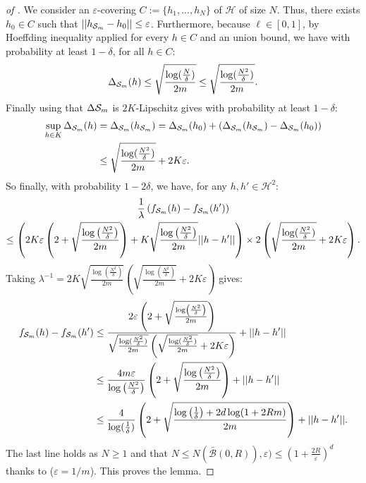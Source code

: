 \begin{noaddcontents}
\begin{proof}[of ]
We consider an $\varepsilon$-covering $C:=\{h_1,...,h_N\}$ of $\mathcal{H}$ of size $N$.
Thus, there exists $h_0\in C$ such that $||h_{\mathcal{S}_m}- h_0||\leq \varepsilon$.
Furthermore, because $\ell \in [0,1]$, by Hoeffding inequality applied for every $h\in C$ and an union bound, we have with probability at least $1-\delta$, for all $h\in C$:
\[ \Delta_{\mathcal{S}_m}(h) \leq  \sqrt{\frac{\log(\frac{N}{\delta})}{2m}} \leq   \sqrt{\frac{\log(\frac{N^2}{\delta})}{2m}}. \]
Finally using that $\Delta{\ensuremath{\mathcal{S}}_m}$ is $2K$-Lipschitz gives with probability at least $1-\delta$:
\begin{align*}
\sup_{h\in K} \Delta_{\mathcal{S}_m}(h) &= \Delta_{\mathcal{S}_m}(h_{\mathcal{S}_m}) = \Delta_{\mathcal{S}_m}(h_0) + \left(\Delta_{\mathcal{S}_m}(h_{\mathcal{S}_m})- \Delta_{\mathcal{S}_m}(h_0)  \right) \\
& \leq  \sqrt{\frac{\log(\frac{N^2}{\delta})}{2m}} + 2K\varepsilon.
\end{align*}
So finally, with probability $1- 2\delta$, we have, for any $h,h'\in \mathcal{H}^2$:
\begin{multline*}
\frac{1}{\lambda} \left(f_{\mathcal{S}_m}(h)-f_{\mathcal{S}_m}(h') \right) \\ \leq \left(2K\varepsilon\left( 2 + \sqrt{\frac{\log\left(\frac{N^2}{\delta}\right)}{2m}}  \right) +  K\sqrt{\frac{\log\left(\frac{N^2}{\delta}\right)}{2m}}||h-h'|| \right)\times
2\left( \sqrt{\frac{\log(\frac{N^2}{\delta})}{2m}} + 2K\varepsilon \right).
\end{multline*}
Taking $\lambda^{-1}=  2K\sqrt{\frac{\log(\frac{N^2}{\delta})}{2m}}\left(\sqrt{\frac{\log(\frac{N^2}{\delta})}{2m}} + 2K\varepsilon \right)$ gives:
\begin{align*}
f_{\mathcal{S}_m}(h)-f_{\mathcal{S}_m}(h')  & \leq \frac{2\varepsilon\left( 2 + \sqrt{\frac{\log\left(\frac{N^2}{\delta}\right)}{2m}}  \right)}{\sqrt{\frac{\log(\frac{N^2}{\delta})}{2m}}\left(\sqrt{\frac{\log(\frac{N^2}{\delta})}{2m}} + 2K\varepsilon \right)} + ||h-h'||\\
& \leq \frac{4m\varepsilon}{\log\left(\frac{N^2}{\delta}\right)} \left( 2 + \sqrt{\frac{\log\left(\frac{N^2}{\delta}\right)}{2m}}  \right) + ||h-h'|| \\
& \leq \frac{4}{\log(\frac{1}{\delta})} \left( 2 + \sqrt{\frac{\log\left(\frac{1}{\delta}\right) + 2d\log(1+2Rm)}{2m}}  \right) + ||h-h'||.
\end{align*}
The last line holds as $N\geq1$ and that $N\leq N(\bar{\mathcal{B}}(0,R)), \varepsilon) \leq \left(1+\frac{2R}{\varepsilon}\right)^d$ thanks to  ($\varepsilon = 1/m$).
This proves the lemma.
\end{proof}


\end{noaddcontents}

